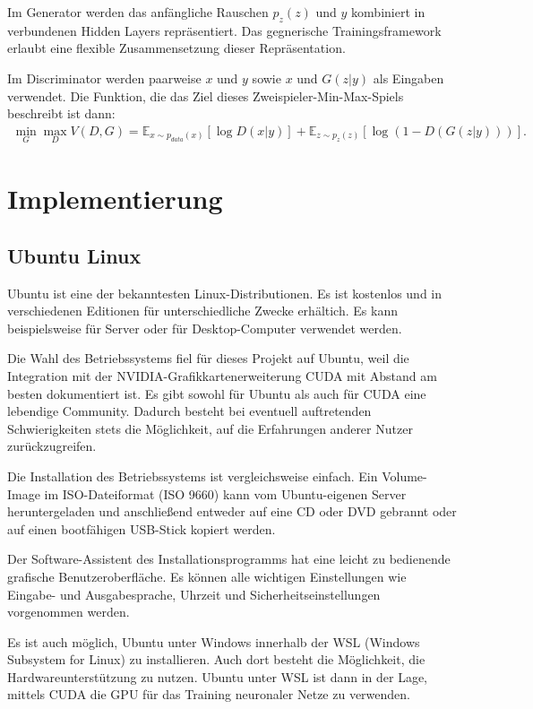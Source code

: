 Im Generator werden das anfängliche Rauschen $p_z(z)$ und $y$ kombiniert in verbundenen Hidden Layers repräsentiert. Das gegnerische Trainingsframework erlaubt eine flexible Zusammensetzung dieser Repräsentation.

Im Discriminator werden paarweise $x$ und $y$ sowie $x$ und $G(z|y)$ als Eingaben verwendet. Die Funktion, die das Ziel dieses Zweispieler-Min-Max-Spiels beschreibt ist dann:
\begin{align}
\min_{G}\max_{D} V(D,G) = \mathbb{E}_{x\sim p_{data}(x)}[\log{D(x|y)}]+\mathbb{E}_{z\sim p_z(z)}[\log(1-D(G(z|y)))].
\end{align}
\cite{mirza2014conditional}

\chapter{Implementierung}
\label{ch:imple}

\section{Ubuntu Linux}
\label{sec:ubuntu}
Ubuntu ist eine der bekanntesten Linux-Distributionen. Es ist kostenlos und in verschiedenen Editionen für unterschiedliche Zwecke erhältich. Es kann beispielsweise für Server oder für Desktop-Computer verwendet werden.

Die Wahl des Betriebssystems fiel für dieses Projekt auf Ubuntu, weil die Integration mit der NVIDIA-Grafikkartenerweiterung CUDA mit Abstand am besten dokumentiert ist. Es gibt sowohl für Ubuntu als auch für CUDA eine lebendige Community. Dadurch besteht bei eventuell auftretenden Schwierigkeiten stets die Möglichkeit, auf die Erfahrungen anderer Nutzer zurückzugreifen.

Die Installation des Betriebssystems ist vergleichsweise einfach. Ein Volume-Image im ISO-Dateiformat (ISO 9660) kann vom Ubuntu-eigenen Server heruntergeladen und anschließend entweder auf eine CD oder DVD gebrannt oder auf einen bootfähigen USB-Stick kopiert werden.

Der Software-Assistent des Installationsprogramms hat eine leicht zu bedienende grafische Benutzeroberfläche. Es können alle wichtigen Einstellungen wie Eingabe- und Ausgabesprache, Uhrzeit und Sicherheitseinstellungen vorgenommen werden.

Es ist auch möglich, Ubuntu unter Windows innerhalb der WSL (Windows Subsystem for Linux) zu installieren. Auch dort besteht die Möglichkeit, die Hardwareunterstützung zu nutzen. Ubuntu unter WSL ist dann in der Lage, mittels CUDA die GPU für das Training neuronaler Netze zu verwenden.

